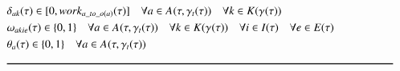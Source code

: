 \begin{alignat}{2}
	& \VarProcessingTime \in [0, \ParOperationWork{\ElementActivity\_to\_o(\ElementActivity)} ]  \quad \forall \ElementActivity \in \SetActivity{\VarSupervisorAssignment{}{\ElementTechnician}}{} \quad \forall \ElementWorkSegment \in \SetWorkSegment                                                \\
	& \VarSegmentInRelation \in \{0 , 1\}                                                                                                                                                                                                                                                                                     \quad \forall \ElementActivity \in \SetActivity{\VarSupervisorAssignment{}{\ElementTechnician}}{} \quad \forall \ElementWorkSegment \in \SetWorkSegment  \quad \forall i \in \SetTimeInstance \quad \forall \ElementEvent \in \SetEvent                                                                                                                         \\
	& \VarIncludeActivity{\ElementActivity} \in \{0, 1\}                                                                                                                                      \quad \forall \ElementActivity \in \SetActivity{\VarSupervisorAssignment{}{\ElementTechnician}}{}                                                                                                     \\ 
	& \text{\rule{\linewidth}{0.8pt}} \notag \label{}                                                                                                                                                                                                                                                                                                                                                                     \\ 
\end{alignat}
